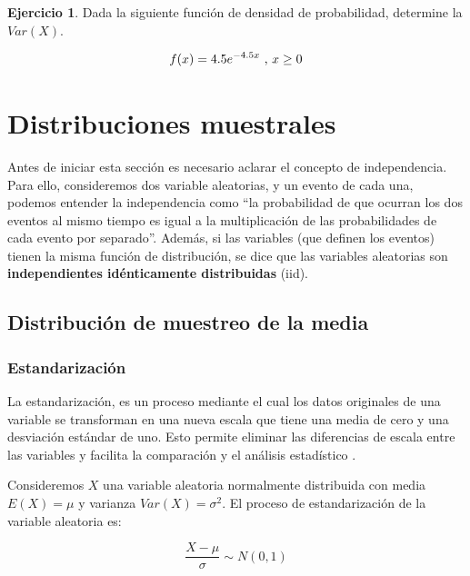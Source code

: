 \documentclass[
  11pt,
]{book}
\theoremstyle{definition}
\theoremstyle{definition}
\theoremstyle{definition}
\newtheorem{exercise}{Ejercicio}[chapter]
\theoremstyle{definition}
\theoremstyle{remark}
\begin{document}
\begin{exercise}

Dada la siguiente función de densidad de probabilidad, determine la \(Var(X)\).

\begin{equation}
\notag
f(x) = 4.5 e^{-4.5x} \text{ , } x \geq 0
\end{equation}

\end{exercise}

\chapter{Distribuciones muestrales}\label{distribuciones-muestrales}

Antes de iniciar esta sección es necesario aclarar el concepto de independencia. Para ello, consideremos dos variable aleatorias, y un evento de cada una, podemos entender la independencia como ``la probabilidad de que ocurran los dos eventos al mismo tiempo es igual a la multiplicación de las probabilidades de cada evento por separado''. Además, si las variables (que definen los eventos) tienen la misma función de distribución, se dice que las variables aleatorias son \textbf{independientes idénticamente distribuidas} (iid).

\section{Distribución de muestreo de la media}\label{distribuciuxf3n-de-muestreo-de-la-media}

\subsection{Estandarización}\label{estandarizaciuxf3n}

La estandarización, es un proceso mediante el cual los datos originales de una variable se transforman en una nueva escala que tiene una media de cero y una desviación estándar de uno. Esto permite eliminar las diferencias de escala entre las variables y facilita la comparación y el análisis estadístico \citep{hair2013multivariate}.

Consideremos \(X\) una variable aleatoria normalmente distribuida con media \(E(X) = \mu\) y varianza \(Var(X) = \sigma^2\). El proceso de estandarización de la variable aleatoria es:

\begin{equation}
\frac{X-\mu}{\sigma} \sim N(0,1)
\label{eq:estandarizacion}
\end{equation}
\end{document}
